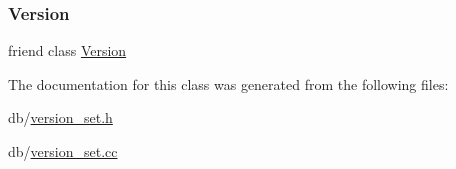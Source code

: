 \mbox{\label{classleveldb_1_1_version_set_ace162f32d4abb584945d3a55a389b0a3}} 
\subsubsection{\texorpdfstring{Version}{Version}}
{\footnotesize\ttfamily friend class \mbox{\hyperlink{classleveldb_1_1_version}{Version}}\hspace{0.3cm}{\ttfamily [friend]}}



The documentation for this class was generated from the following files\+:\begin{DoxyCompactItemize}
\item 
db/\mbox{\hyperlink{version__set_8h}{version\+\_\+set.\+h}}\item 
db/\mbox{\hyperlink{version__set_8cc}{version\+\_\+set.\+cc}}\end{DoxyCompactItemize}
